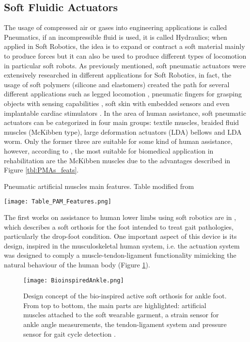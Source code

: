 \subsection{Soft Fluidic Actuators}

The usage of compressed air or gases into engineering applications is called Pneumatics, if an incompressible fluid is used, it is called Hydraulics; when applied in Soft Robotics, the idea is to expand or contract a soft material mainly to produce forces but it can also be used to produce different types of locomotion in particular soft robots. As previously mentioned, soft pneumatic actuators were extensively researched in different applications for Soft Robotics, in fact, the usage of soft polymers (silicone and elastomers) created the path for several different applications such as legged locomotion \cite{Florez2014}, pneumatic fingers for grasping objects with sensing capabilities \cite{Morrow2015}, soft skin with embedded sensors \cite{Sonar2016,Suh2014} and even implantable cardiac stimulators \cite{Roche2014}. In the area of human assistance, soft pneumatic actuators can be categorized in four main groups: textile muscles, braided fluid muscles (McKibben type), large deformation actuators (LDA) bellows and LDA worm. Only the former three are suitable for some kind of human assistance, however, according to \cite{Belforte2014}, the most suitable for biomedical application in rehabilitation are the McKibben muscles due to the advantages described in Figure \ref{tbl:PMAs_feats}.

\begin{table}[hb!]
  \caption{Pneumatic artificial muscles main features. Table modified from \cite{Belforte2014}}
  \label{tbl:PMAs_feats}
  \centering
  \texttt{[image: Table\_PAM\_Features.png]}
\end{table}

The first works on assistance to human lower limbs using soft robotics are in \cite{park2011bio,Hamedi2015}, which describes a soft orthosis for the foot intended to treat gait pathologies, particularly the drop-foot condition. One important aspect of this device is its design, inspired in the musculoskeletal human system, i.e. the actuation system was designed to comply a muscle-tendon-ligament functionality mimicking the natural behaviour of the human body (Figure \ref{fig:bio_ankle}).

\begin{figure}[hb!]
    \centering
    \texttt{[image: BioinspiredAnkle.png]}
    \caption{Design concept of the bio-inspired active soft orthosis for ankle foot. From top to bottom, the main parts are highlighted: artificial muscles attached to the soft wearable garment, a strain sensor for ankle angle measurements, the tendon-ligament system and pressure sensor for gait cycle detection \cite{park2011bio}. }
    \label{fig:bio_ankle}
\end{figure}

